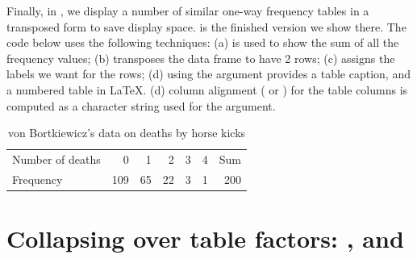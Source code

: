 \documentclass[11pt]{book}
\begin{document}
Finally, in , we display a number of similar one-way
frequency tables in a transposed form to save display space.  
 is the finished version we show there. 
The code below uses the following techniques:
(a)  is used to show the sum of all the frequency values;
(b)  transposes the data frame to have 2 rows;
(c)  assigns the labels we want for the rows;
(d) using the  argument provides a table caption, and a numbered
table in \LaTeX.
(d) column alignment ( or ) for the table columns
is computed as a character string used for the  argument.
\begin{kframe}
\begin{alltt}
 \hlkwb{<-} \hlstd{(} \hlstd{(} 
 \hlkwb{<-} \hlstd{(} \hlstd{,}  \hlstd{)}
 \hlkwb{<-}   \hlstd{=} \hlstd{,}
      \hlstd{=} \hlstd{,}
      \hlstd{=} \hlstd{(}\hlstd{,} \hlstd{(}\hlstd{(}\hlstd{,}  \hlstd{=}\hlstd{))}
     \hlstd{)}
 \hlstd{=}\hlstd{)}
\end{alltt}
\end{kframe}%
\begin{table}[ht]
\centering
\begin{tabular}{l|rrrrrr}
  \hline
  \hline
Number of deaths & 0 & 1 & 2 & 3 & 4 & Sum \\ 
  Frequency & 109 &  65 &  22 &   3 &   1 & 200 \\ 
   \hline
\end{tabular}
\caption{von Bortkiewicz's data on deaths by horse kicks} 
\end{table}



\section[Collapsing over table factors]{Collapsing over table factors: ,  and }\label{sec:collapse}
\end{document}
